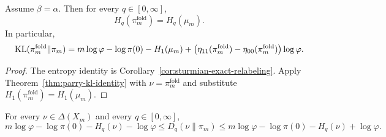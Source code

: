 \begin{corollary}\label{cor:no-fold-entropy-loss}
Assume \(\beta=\alpha\). Then for every \(q\in[0,\infty]\),
\[
H_q(\pi_m^{\mathrm{fold}})=H_q(\mu_m).
\]
In particular,
\[
\operatorname{KL}(\pi_m^{\mathrm{fold}}\|\pi_m)
=
m\log\varphi-\log\pi(0)-H_1(\mu_m)
+
\bigl(\eta_{11}(\pi_m^{\mathrm{fold}})
-\eta_{00}(\pi_m^{\mathrm{fold}})\bigr)\log\varphi.
\]
\end{corollary}

\begin{proof}
The entropy identity is Corollary~\ref{cor:sturmian-exact-relabeling}. Apply
Theorem~\ref{thm:parry-kl-identity} with \(\nu=\pi_m^{\mathrm{fold}}\) and
substitute \(H_1(\pi_m^{\mathrm{fold}})=H_1(\mu_m)\).
\end{proof}

\begin{proposition}
\label{prop:parry-renyi-window}
For every \(\nu\in\Delta(X_m)\) and every \(q\in[0,\infty]\),
\[
m\log\varphi-\log\pi(0)-H_q(\nu)-\log\varphi
\le
D_q(\nu\|\pi_m)
\le
m\log\varphi-\log\pi(0)-H_q(\nu)+\log\varphi.
\]
\end{proposition}


